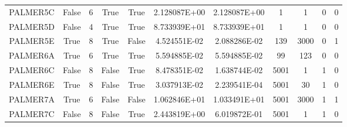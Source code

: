 \begin{longtable}{ccccccccccc}
	\cellcolor{default2} PALMER5C& \cellcolor{default2} False& \cellcolor{default2} 6& \cellcolor{default2} True& \cellcolor{default2} True& \cellcolor{best} 2.128087E+00& \cellcolor{ok} 2.128087E+00& \cellcolor{best} 1& \cellcolor{best} 1& \cellcolor{default2} 0& \cellcolor{default2} 0\\
	\cellcolor{default1} PALMER5D& \cellcolor{default1} False& \cellcolor{default1} 4& \cellcolor{default1} True& \cellcolor{default1} True& \cellcolor{ok} 8.733939E+01& \cellcolor{best} 8.733939E+01& \cellcolor{best} 1& \cellcolor{best} 1& \cellcolor{default1} 0& \cellcolor{default1} 0\\
	\cellcolor{default2} PALMER5E& \cellcolor{default2} True& \cellcolor{default2} 8& \cellcolor{default2} True& \cellcolor{default2} False& \cellcolor{poor} 4.524551E-02& \cellcolor{best} 2.088286E-02& \cellcolor{best} 139& \cellcolor{poor} 3000& \cellcolor{default2} 0& \cellcolor{default2} 1\\
	\cellcolor{default1} PALMER6A& \cellcolor{default1} True& \cellcolor{default1} 6& \cellcolor{default1} True& \cellcolor{default1} True& \cellcolor{ok} 5.594885E-02& \cellcolor{best} 5.594885E-02& \cellcolor{best} 99& \cellcolor{ok} 123& \cellcolor{default1} 0& \cellcolor{default1} 0\\
	\cellcolor{default2} PALMER6C& \cellcolor{default2} False& \cellcolor{default2} 8& \cellcolor{default2} False& \cellcolor{default2} True& \cellcolor{poor} 8.478351E-02& \cellcolor{best} 1.638744E-02& \cellcolor{poor} 5001& \cellcolor{best} 1& \cellcolor{default2} 1& \cellcolor{default2} 0\\
	\cellcolor{default1} PALMER6E& \cellcolor{default1} True& \cellcolor{default1} 8& \cellcolor{default1} False& \cellcolor{default1} True& \cellcolor{poor} 3.037913E-02& \cellcolor{best} 2.239541E-04& \cellcolor{poor} 5001& \cellcolor{best} 30& \cellcolor{default1} 1& \cellcolor{default1} 0\\
	\cellcolor{default2} PALMER7A& \cellcolor{default2} True& \cellcolor{default2} 6& \cellcolor{default2} False& \cellcolor{default2} False& \cellcolor{poor} 1.062846E+01& \cellcolor{best} 1.033491E+01& \cellcolor{ok} 5001& \cellcolor{best} 3000& \cellcolor{default2} 1& \cellcolor{default2} 1\\
	\cellcolor{default1} PALMER7C& \cellcolor{default1} False& \cellcolor{default1} 8& \cellcolor{default1} False& \cellcolor{default1} True& \cellcolor{poor} 2.443819E+00& \cellcolor{best} 6.019872E-01& \cellcolor{poor} 5001& \cellcolor{best} 1& \cellcolor{default1} 1& \cellcolor{default1} 0\\

\end{longtable}
